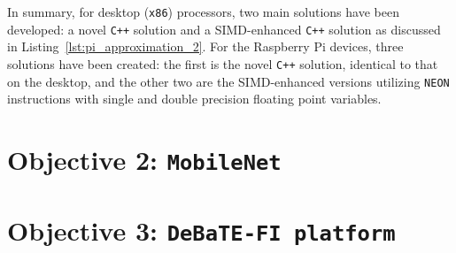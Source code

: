 In summary, for desktop (\texttt{x86}) processors, two main solutions have been developed: a novel \texttt{C++} solution and a SIMD-enhanced \texttt{C++} solution as discussed in Listing~\ref{lst:pi_approximation_2}. For the Raspberry Pi devices, three solutions have been created: the first is the novel \texttt{C++} solution, identical to that on the desktop, and the other two are the SIMD-enhanced versions utilizing \texttt{NEON} instructions with single and double precision floating point variables.

\section{Objective 2: \texttt{MobileNet}}
\section{Objective 3: \texttt{DeBaTE-FI platform}}